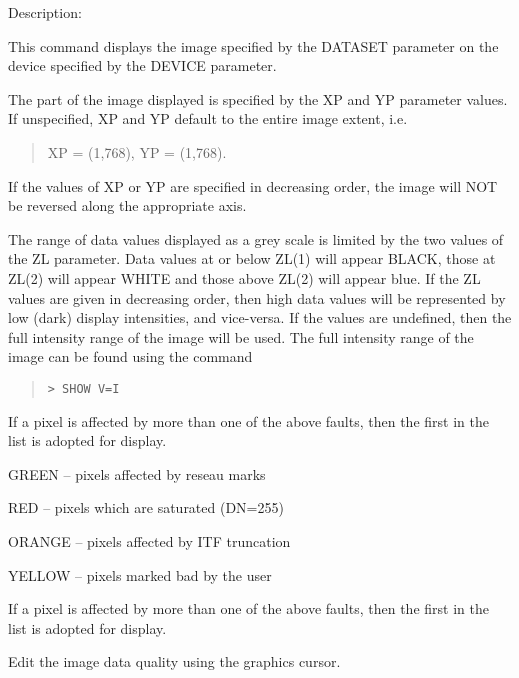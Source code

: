 \begin {description}
\begin {description}
\item Description:

This command displays the image specified by the DATASET
parameter on the device specified by the DEVICE parameter.

The part of the image displayed is specified by the XP and YP
parameter values.
If unspecified, XP and YP default to the entire image extent, i.e.

\begin {quote}
      XP = (1,768), YP = (1,768).
\end {quote}

If the values of XP or YP are specified in decreasing order, the
image will NOT be reversed along the appropriate axis.

The range of data values displayed as a grey scale is limited
by the two values of the ZL parameter.
Data values at or below ZL(1) will appear BLACK, those at ZL(2) will
appear WHITE and those above ZL(2) will appear blue.
If the ZL values are given in decreasing order, then high data
values will be represented by low (dark) display intensities,
and vice-versa.
If the values are undefined, then the full intensity range of the
image will be used.
The full intensity range of the image can be found using the command

\begin {quote}
\begin{verbatim}
> SHOW V=I
\end{verbatim}
\end {quote}

If a pixel is affected by more than one of the above faults, then
the first in the list is adopted for display.

\begin {description}
\item GREEN -- pixels affected by reseau marks
\item RED -- pixels which are saturated (DN=255)
\item ORANGE -- pixels affected by ITF truncation
\item YELLOW -- pixels marked bad by the user
\end {description}

If a pixel is affected by more than one of the above faults, then
the first in the list is adopted for display.
\end {description}

\item [EDIMAGE]
Edit the image data quality using the graphics cursor.


\end{description}

